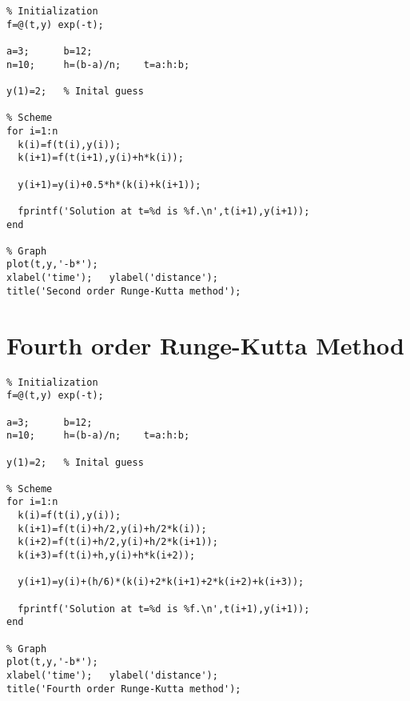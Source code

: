 \begin{verbatim}
% Initialization
f=@(t,y) exp(-t);

a=3;      b=12;
n=10;     h=(b-a)/n;    t=a:h:b;

y(1)=2;   % Inital guess

% Scheme
for i=1:n
  k(i)=f(t(i),y(i));
  k(i+1)=f(t(i+1),y(i)+h*k(i));

  y(i+1)=y(i)+0.5*h*(k(i)+k(i+1));

  fprintf('Solution at t=%d is %f.\n',t(i+1),y(i+1));
end

% Graph
plot(t,y,'-b*');
xlabel('time');   ylabel('distance');
title('Second order Runge-Kutta method');

\end{verbatim}
\clearpage

\section{Fourth order Runge-Kutta Method}

\begin{verbatim}
% Initialization
f=@(t,y) exp(-t);

a=3;      b=12;
n=10;     h=(b-a)/n;    t=a:h:b;

y(1)=2;   % Inital guess

% Scheme
for i=1:n
  k(i)=f(t(i),y(i));
  k(i+1)=f(t(i)+h/2,y(i)+h/2*k(i));
  k(i+2)=f(t(i)+h/2,y(i)+h/2*k(i+1));
  k(i+3)=f(t(i)+h,y(i)+h*k(i+2));

  y(i+1)=y(i)+(h/6)*(k(i)+2*k(i+1)+2*k(i+2)+k(i+3));

  fprintf('Solution at t=%d is %f.\n',t(i+1),y(i+1));
end

% Graph
plot(t,y,'-b*');
xlabel('time');   ylabel('distance');
title('Fourth order Runge-Kutta method');
\end{verbatim}
